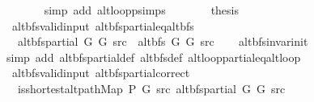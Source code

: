 \begin{isabellebody}
\ \ \ \ \ \ \isamarkupfalse%
\ {\isacharparenleft}{\kern0pt}simp\ add{\isacharcolon}{\kern0pt}\ alt{\isacharunderscore}{\kern0pt}loop{\isacharunderscore}{\kern0pt}psimps{\isacharparenright}{\kern0pt}\isanewline
\ \ \ \ \isamarkupfalse%
\ \isamarkupfalse%
\ {\isacharquery}{\kern0pt}thesis\isanewline
\ \ \ \ \ \ \isacommand{{\isachardot}{\kern0pt}}\isamarkupfalse%
\isanewline
\ \ \isamarkupfalse%
\isanewline
{}\isamarkupfalse%
%
\endisatagproof
{\isafoldproof}%
%
\isadelimproof
\isanewline
%
\endisadelimproof
\isanewline
{}\isamarkupfalse%
\ {\isacharparenleft}{\kern0pt}\ alt{\isacharunderscore}{\kern0pt}bfs{\isacharunderscore}{\kern0pt}valid{\isacharunderscore}{\kern0pt}input{\isacharparenright}{\kern0pt}\ alt{\isacharunderscore}{\kern0pt}bfs{\isacharunderscore}{\kern0pt}partial{\isacharunderscore}{\kern0pt}eq{\isacharunderscore}{\kern0pt}alt{\isacharunderscore}{\kern0pt}bfs{\isacharcolon}{\kern0pt}\isanewline
\ \ \ {\isachardoublequoteopen}alt{\isacharunderscore}{\kern0pt}bfs{\isacharunderscore}{\kern0pt}partial\ G{}\ G{}\ src\ {\isacharequal}{\kern0pt}\ alt{\isacharunderscore}{\kern0pt}bfs\ G{}\ G{}\ src{\isachardoublequoteclose}\isanewline
%
\isadelimproof
\ \ %
\endisadelimproof
%
\isatagproof
{}\isamarkupfalse%
\ alt{\isacharunderscore}{\kern0pt}bfs{\isacharunderscore}{\kern0pt}invar{\isacharunderscore}{\kern0pt}init\isanewline
\ \ \isamarkupfalse%
\ {\isacharparenleft}{\kern0pt}simp\ add{\isacharcolon}{\kern0pt}\ alt{\isacharunderscore}{\kern0pt}bfs{\isacharunderscore}{\kern0pt}partial{\isacharunderscore}{\kern0pt}def\ alt{\isacharunderscore}{\kern0pt}bfs{\isacharunderscore}{\kern0pt}def\ alt{\isacharunderscore}{\kern0pt}loop{\isacharunderscore}{\kern0pt}partial{\isacharunderscore}{\kern0pt}eq{\isacharunderscore}{\kern0pt}alt{\isacharunderscore}{\kern0pt}loop{\isacharparenright}{\kern0pt}%
\endisatagproof
{\isafoldproof}%
%
\isadelimproof
\isanewline
%
\endisadelimproof
\isanewline
{}\isamarkupfalse%
\ {\isacharparenleft}{\kern0pt}\ alt{\isacharunderscore}{\kern0pt}bfs{\isacharunderscore}{\kern0pt}valid{\isacharunderscore}{\kern0pt}input{\isacharparenright}{\kern0pt}\ alt{\isacharunderscore}{\kern0pt}bfs{\isacharunderscore}{\kern0pt}partial{\isacharunderscore}{\kern0pt}correct{\isacharcolon}{\kern0pt}\isanewline
\ \ \ {\isachardoublequoteopen}is{\isacharunderscore}{\kern0pt}shortest{\isacharunderscore}{\kern0pt}alt{\isacharunderscore}{\kern0pt}path{\isacharunderscore}{\kern0pt}Map\ P{\isacharprime}{\kern0pt}{\isacharprime}{\kern0pt}\ G\ src\ {\isacharparenleft}{\kern0pt}alt{\isacharunderscore}{\kern0pt}bfs{\isacharunderscore}{\kern0pt}partial\ G{}\ G{}\ src{\isacharparenright}{\kern0pt}{\isachardoublequoteclose}\isanewline

\end{isabellebody}
